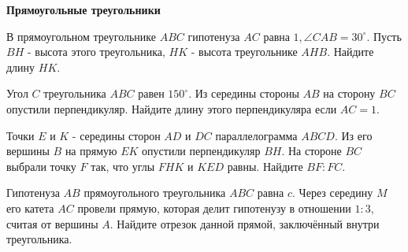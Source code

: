 \centerline{\bf \Huge Прямоугольные треугольники}
\centerline{\bf \Huge }

\begin{flushright}
        \scriptsize{}
\end{flushright}

В прямоугольном треугольнике $A B C$ гипотенуза $A C$ равна $1, \angle C A B=30^{\circ}$. Пусть $B H$ - высота этого треугольника, $H K$ - высота треугольнике $A H B$. Найдите длину $H K$.

Угол $C$ треугольника $A B C$ равен $150^{\circ}$. Из середины стороны $A B$ на сторону $B C$ опустили перпендикуляр. Найдите длину этого перпендикуляра если $A C=1$.

Точки $E$ и $K$ - середины сторон $A D$ и $D C$ параллелограмма $A B C D$. Из его вершины $B$ на прямую $E K$ опустили перпендикуляр $B H$. На стороне $B C$ выбрали точку $F$ так, что углы $F H K$ и $K E D$ равны. Найдите $B F: F C$.

Гипотенуза $A B$ прямоугольного треугольника $A B C$ равна $c$. Через середину $M$ его катета $A C$ провели прямую, которая делит гипотенузу в отношении $1: 3$, считая от вершины $A$. Найдите отрезок данной прямой, заключённый внутри треугольника.